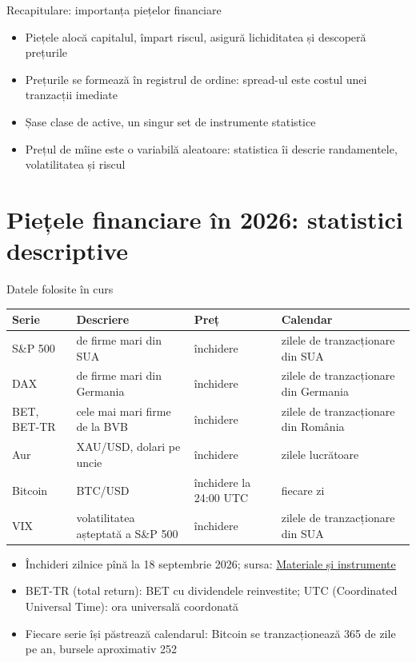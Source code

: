 \begin{frame}{Recapitulare: importanța piețelor financiare}
\itemsize{\small}
\begin{itemize}
    \item Piețele alocă capitalul, împart riscul, asigură lichiditatea și descoperă prețurile
    \item Prețurile se formează în registrul de ordine: spread-ul este costul unei tranzacții imediate
    \item Șase clase de active, un singur set de instrumente statistice
    \item Prețul de mîine este o variabilă aleatoare: statistica îi descrie randamentele, volatilitatea și riscul
\end{itemize}
\end{frame}


\section{Piețele financiare în 2026: statistici descriptive}

\begin{frame}{Datele folosite în curs}
\itemsize{\footnotesize}
\begin{center}
\footnotesize
\begin{tabular}{>{\raggedright\arraybackslash}p{1.9cm}>{\raggedright\arraybackslash}p{4.3cm}>{\raggedright\arraybackslash}p{2.7cm}>{\raggedright\arraybackslash}p{3.4cm}}
\toprule
\textbf{Serie} & \textbf{Descriere} & \textbf{Preț} & \textbf{Calendar} \\
\midrule
S\&P 500 & 500 de firme mari din SUA & închidere & zilele de tranzacționare din SUA \\
DAX & 40 de firme mari din Germania & închidere & zilele de tranzacționare din Germania \\
BET, BET-TR & cele mai mari firme de la BVB & închidere & zilele de tranzacționare din România \\
Aur & XAU/USD, dolari pe uncie & închidere & zilele lucrătoare \\
Bitcoin & BTC/USD & închidere la 24:00 UTC & fiecare zi \\
VIX & volatilitatea așteptată a S\&P 500 & închidere & zilele de tranzacționare din SUA \\
\bottomrule
\end{tabular}
\end{center}
\begin{itemize}
    \item Închideri zilnice pînă la 18 septembrie 2026; sursa: \hyperlink{ch0-materials}{\textcolor{MainBlue}{Materiale și instrumente}}
    \item BET-TR (total return): BET cu dividendele reinvestite; UTC (Coordinated Universal Time): ora universală coordonată
    \item Fiecare serie își păstrează calendarul: Bitcoin se tranzacționează 365 de zile pe an, bursele aproximativ 252
\end{itemize}
\end{frame}

